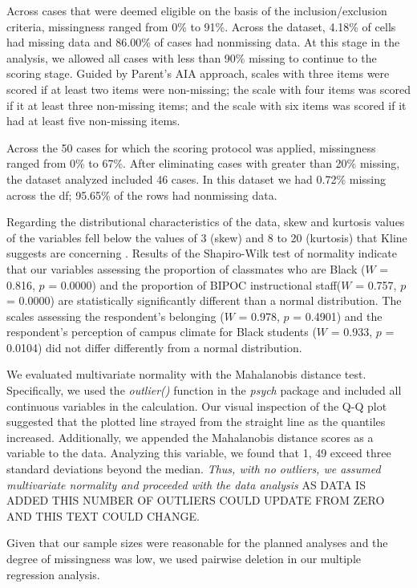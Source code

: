\documentclass[
  11pt,
]{book}
\begin{document}
Across cases that were deemed eligible on the basis of the inclusion/exclusion criteria, missingness ranged from 0\% to 91\%. Across the dataset, 4.18\% of cells had missing data and 86.00\% of cases had nonmissing data. At this stage in the analysis, we allowed all cases with less than 90\% missing to continue to the scoring stage. Guided by Parent's \citeyearpar{parent_handling_2013} AIA approach, scales with three items were scored if at least two items were non-missing; the scale with four items was scored if it at least three non-missing items; and the scale with six items was scored if it had at least five non-missing items.

Across the 50 cases for which the scoring protocol was applied, missingness ranged from 0\% to 67\%. After eliminating cases with greater than 20\% missing, the dataset analyzed included 46 cases. In this dataset we had 0.72\% missing across the df; 95.65\% of the rows had nonmissing data.

Regarding the distributional characteristics of the data, skew and kurtosis values of the variables fell below the values of 3 (skew) and 8 to 20 (kurtosis) that Kline suggests are concerning \citeyearpar{kline_principles_2016}. Results of the Shapiro-Wilk test of normality indicate that our variables assessing the proportion of classmates who are Black (\(W\) = 0.816, \(p\) = 0.0000) and the proportion of BIPOC instructional staff(\(W\) = 0.757, \(p\) = 0.0000) are statistically significantly different than a normal distribution. The scales assessing the respondent's belonging (\(W\) = 0.978, \(p\) = 0.4901) and the respondent's perception of campus climate for Black students (\(W\) = 0.933, \(p\) = 0.0104) did not differ differently from a normal distribution.

We evaluated multivariate normality with the Mahalanobis distance test. Specifically, we used the \emph{outlier()} function in the \emph{psych} package and included all continuous variables in the calculation. Our visual inspection of the Q-Q plot suggested that the plotted line strayed from the straight line as the quantiles increased. Additionally, we appended the Mahalanobis distance scores as a variable to the data. Analyzing this variable, we found that 1, 49 exceed three standard deviations beyond the median. \emph{Thus, with no outliers, we assumed multivariate normality and proceeded with the data analysis} AS DATA IS ADDED THIS NUMBER OF OUTLIERS COULD UPDATE FROM ZERO AND THIS TEXT COULD CHANGE.

Given that our sample sizes were reasonable for the planned analyses and the degree of missingness was low, we used pairwise deletion in our multiple regression analysis.
\end{document}
